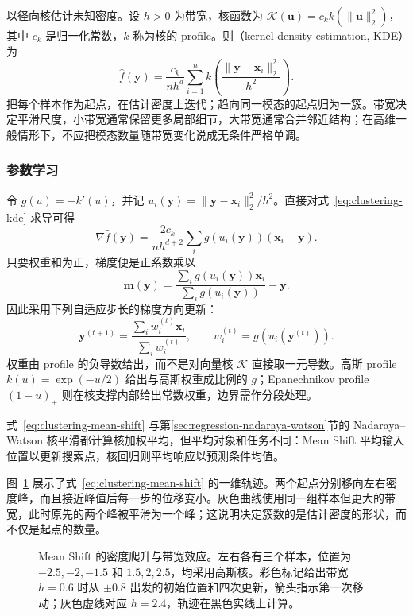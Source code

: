 以径向核估计未知密度。设 $h>0$ 为带宽，核函数为 $\mathcal{K}(\bm{u})=c_k k(\lVert\bm{u}\rVert_2^2)$，其中 $c_k$ 是归一化常数，$k$ 称为核的 profile。则（kernel density estimation, KDE）为
\begin{equation}
 \hat f(\bm{y})=\frac{c_k}{nh^d}
 \sum_{i=1}^n
 k\left(\frac{\lVert\bm{y}-\bm{x}_i\rVert_2^2}{h^2}\right).
 \label{eq:clustering-kde}
\end{equation}
把每个样本作为起点，在估计密度上迭代；趋向同一模态的起点归为一簇。带宽决定平滑尺度，小带宽通常保留更多局部细节，大带宽通常合并邻近结构；在高维一般情形下，不应把模态数量随带宽变化说成无条件严格单调。

\subsubsection{参数学习}

令 $g(u)=-k'(u)$，并记 $u_i(\bm{y})=\lVert\bm{y}-\bm{x}_i\rVert_2^2/h^2$。直接对式~\eqref{eq:clustering-kde} 求导可得
\[
 \nabla\hat f(\bm{y})=
 \frac{2c_k}{nh^{d+2}}
 \sum_i g(u_i(\bm{y}))(\bm{x}_i-\bm{y}).
\]
只要权重和为正，梯度便是正系数乘以
\[
 \bm{m}(\bm{y})=
 \frac{\sum_i g(u_i(\bm{y}))\bm{x}_i}
      {\sum_i g(u_i(\bm{y}))}-\bm{y}.
\]
因此采用下列自适应步长的梯度方向更新：
\begin{equation}
 \bm{y}^{(t+1)}=
 \frac{\sum_i w_i^{(t)}\bm{x}_i}{\sum_i w_i^{(t)}},
 \qquad w_i^{(t)}=g(u_i(\bm{y}^{(t)})).
 \label{eq:clustering-mean-shift}
\end{equation}
权重由 profile 的负导数给出，而不是对向量核 $\mathcal{K}$ 直接取一元导数。高斯 profile $k(u)=\exp(-u/2)$ 给出与高斯权重成比例的 $g$；Epanechnikov profile $(1-u)_+$ 则在核支撑内部给出常数权重，边界需作分段处理。

式~\eqref{eq:clustering-mean-shift} 与第\ref{sec:regression-nadaraya-watson}节的 Nadaraya--Watson 核平滑都计算核加权平均，但平均对象和任务不同：Mean Shift 平均输入位置以更新搜索点，核回归则平均响应以预测条件均值。

图~\ref{fig:clustering-mean-shift-modes} 展示了式~\eqref{eq:clustering-mean-shift} 的一维轨迹。两个起点分别移向左右密度峰，而且接近峰值后每一步的位移变小。灰色曲线使用同一组样本但更大的带宽，此时原先的两个峰被平滑为一个峰；这说明决定簇数的是估计密度的形状，而不仅是起点的数量。

\Needspace{90mm}
\begin{figure}[htbp]
 \centering
 
 \caption{Mean Shift 的密度爬升与带宽效应。左右各有三个样本，位置为 $-2.5,-2,-1.5$ 和 $1.5,2,2.5$，均采用高斯核。彩色标记给出带宽 $h=0.6$ 时从 $\pm0.8$ 出发的初始位置和四次更新，箭头指示第一次移动；灰色虚线对应 $h=2.4$，轨迹在黑色实线上计算。}
 \label{fig:clustering-mean-shift-modes}
\end{figure}

